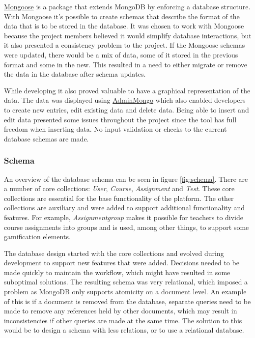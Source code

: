 \href{http://www.mongoosejs.com}{Mongoose} is a package that extends MongoDB by enforcing a database structure. With Mongoose it's possible to create schemas that describe the format of the data that is to be stored in the database. It was chosen to work with Mongoose because the project members believed it would simplify database interactions, but it also presented a consistency problem to the project. If the Mongoose schemas were updated, there would be a mix of data, some of it stored in the previous format and some in the new. This resulted in a need to either migrate or remove the data in the database after schema updates.

While developing it also proved valuable to have a graphical representation of the data. The data was displayed using \href{https://github.com/mrvautin/adminMongo}{AdminMongo} which also enabled developers to create new entries, edit existing data and delete data. Being able to insert and edit data presented some issues throughout the project since the tool has full freedom when inserting data. No input validation or checks to the current database schemas are made. 

\subsubsection{Schema}
An overview of the database schema can be seen in figure \ref{fig:schema}. There are a number of core collections: \emph{User}, \emph{Course}, \emph{Assignment} and \emph{Test}. These core collections are essential for the base functionality of the platform. The other collections are auxiliary and were added to support additional functionality and features. For example, \emph{Assignmentgroup} makes it possible for teachers to divide course assignments into groups and is used, among other things, to support some gamification elements.

The database design started with the core collections and evolved during development to support new features that were added. Decisions needed to be made quickly to maintain the workflow, which might have resulted in some suboptimal solutions. The resulting schema was very relational, which imposed a problem as MongoDB only supports atomicity on a document level. An example of this is if a document is removed from the database, separate queries need to be made to remove any references held by other documents, which may result in inconsistencies if other queries are made at the same time. The solution to this would be to design a schema with less relations, or to use a relational database.

